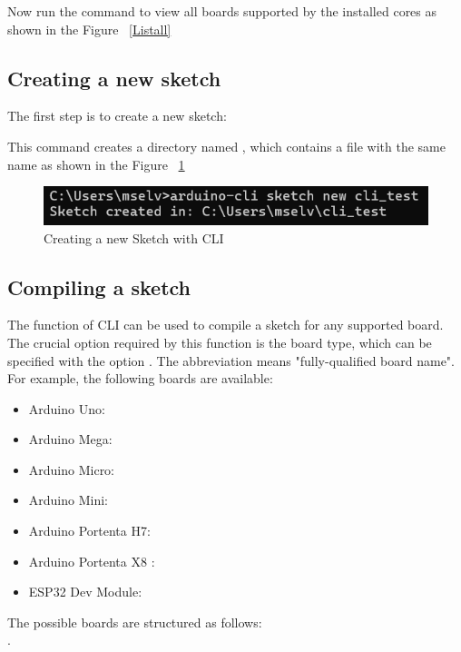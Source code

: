 Now run the command  to view all boards supported by the installed cores as shown in the Figure ~\ref{Listall}

\subsection{Creating a new sketch}
The first step is to create a new sketch:

	
This command creates a directory named , which contains a file with the same name as shown in the Figure ~\ref{NewSketch}
\begin{figure}
	\begin{center}
		\includegraphics[width=0.7\linewidth]{Images/ArduinoCLI/NewSketch.png}
		\caption{Creating a new Sketch with CLI}
		\label{NewSketch}
	\end{center}
\end{figure}

\subsection{Compiling a sketch}
The function  of CLI can be used to compile a sketch for any supported board. The crucial option required by this function is the board type, which can be specified with the option . The abbreviation  means "fully-qualified board name". For example, the following boards are available:
\begin{itemize}
	\item Arduino Uno: 
	\item Arduino Mega: 
	\item Arduino Micro:  
	\item Arduino Mini: 
	\item Arduino Portenta H7: 
	\item Arduino Portenta X8 : 
	\item ESP32 Dev Module: 
\end{itemize}

The possible boards are structured as follows: \\
.

